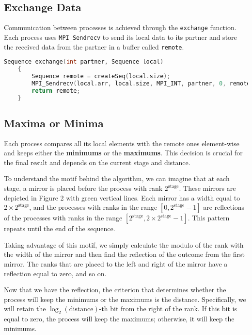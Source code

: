 \documentclass[12pt]{article}
\begin{document}
\subsection{Exchange Data}
Communication between processes is achieved through the \texttt{exchange} function. Each process uses \texttt{MPI\_Sendrecv} to send its local data to its partner and store the received data from the partner in a buffer called \texttt{remote}.
\vspace{0.3cm}
\begin{lstlisting}[language=C]
    Sequence exchange(int partner, Sequence local)
    {
        Sequence remote = createSeq(local.size);
        MPI_Sendrecv(local.arr, local.size, MPI_INT, partner, 0, remote.arr, remote.size, MPI_INT, partner, 0, MPI_COMM_WORLD, MPI_STATUS_IGNORE);
        return remote;
    }
\end{lstlisting}

\subsection{Maxima or Minima}
Each process compares all its local elements with the remote ones element-wise and keeps either the \textbf{minimums} or the \textbf{maximums}. This decision is crucial for the final result and depends on the current stage and distance.

To understand the motif behind the algorithm, we can imagine that at each stage, a mirror is placed before the process with rank \( 2^{\text{stage}} \). These mirrors are depicted in Figure 2 with green vertical lines. Each mirror has a width equal to \( 2 \times 2^{\text{stage}} \), and the processes with ranks in the range \([0, 2^{\text{stage}} - 1]\) are reflections of the processes with ranks in the range \([2^{\text{stage}}, 2 \times 2^{\text{stage}} - 1]\). This pattern repeats until the end of the sequence.

Taking advantage of this motif, we simply calculate the modulo of the rank with the width of the mirror and then find the reflection of the outcome from the first mirror. The ranks that are placed to the left and right of the mirror have a reflection equal to zero, and so on. 

Now that we have the reflection, the criterion that determines whether the process will keep the minimums or the maximums is the distance. Specifically, we will retain the \( \log_2(\text{distance}) \)-th bit from the right of the rank. If this bit is equal to zero, the process will keep the maximums; otherwise, it will keep the minimums.
\end{document}
